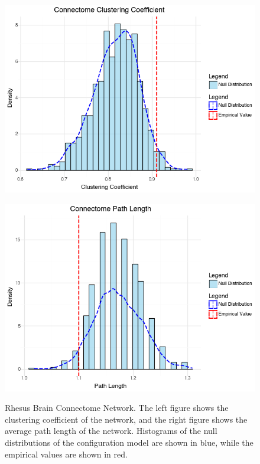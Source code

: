 \documentclass[12pt]{article}
\begin{document}
\begin{figure}[h]
    \centering
    \begin{minipage}{0.45\textwidth}
        \centering
        \includegraphics[width=\textwidth]{../figures/connectome_clustering.png}
        \label{fig:connectome_network_clustering}
    \end{minipage}
    \hfill
    \begin{minipage}{0.45\textwidth}
        \centering
        \includegraphics[width=\textwidth]{../figures/connectome_path.png}
        \label{fig:connectome_network_pathlength}
    \end{minipage}
    \caption{Rhesus Brain Connectome Network. The left figure shows the clustering coefficient of the network, and the right figure shows the average path length of the network. Histograms of the null distributions of the configuration model are shown in blue, while the empirical values are shown in red.}
    \label{fig:Rhesus_connectome_network}
\end{figure}
\end{document}
